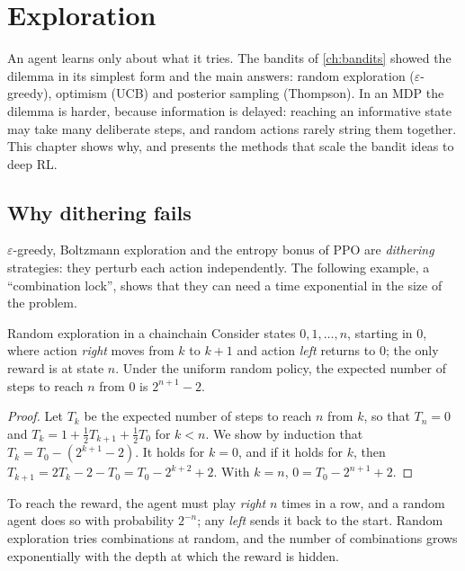 \chapter{Exploration}
\label{ch:exploration}

An agent learns only about what it tries. The bandits of \cref{ch:bandits}
showed the dilemma in its simplest form and the main answers: random
exploration ($\varepsilon$-greedy), optimism (UCB) and posterior sampling
(Thompson). In an MDP the dilemma is harder, because information is
delayed: reaching an informative state may take many deliberate steps, and
random actions rarely string them together. This chapter shows why, and
presents the methods that scale the bandit ideas to deep RL.

\section{Why dithering fails}

$\varepsilon$-greedy, Boltzmann exploration and the entropy bonus of PPO
are \emph{dithering} strategies: they perturb each action independently.
The following example, a ``combination lock'', shows that they can need a
time exponential in the size of the problem.

\begin{proposition}{Random exploration in a chain}{chain}
  Consider states $0, 1, \dots, n$, starting in $0$, where action
  \emph{right} moves from $k$ to $k + 1$ and action \emph{left} returns to
  $0$; the only reward is at state $n$. Under the uniform random policy,
  the expected number of steps to reach $n$ from $0$ is $2^{n+1} - 2$.
\end{proposition}

\begin{proof}
  Let $T_k$ be the expected number of steps to reach $n$ from $k$, so that
  $T_n = 0$ and $T_k = 1 + \frac{1}{2} T_{k+1} + \frac{1}{2} T_0$ for $k <
  n$. We show by induction that $T_k = T_0 - (2^{k+1} - 2)$. It holds for
  $k = 0$, and if it holds for $k$, then $T_{k+1} = 2 T_k - 2 - T_0 = T_0 -
  2^{k+2} + 2$. With $k = n$, $0 = T_0 - 2^{n+1} + 2$.
\end{proof}

\begin{intuition}
  To reach the reward, the agent must play \emph{right} $n$ times in a row,
  and a random agent does so with probability $2^{-n}$; any \emph{left}
  sends it back to the start. Random exploration tries combinations at
  random, and the number of combinations grows exponentially with the
  depth at which the reward is hidden.
\end{intuition}

